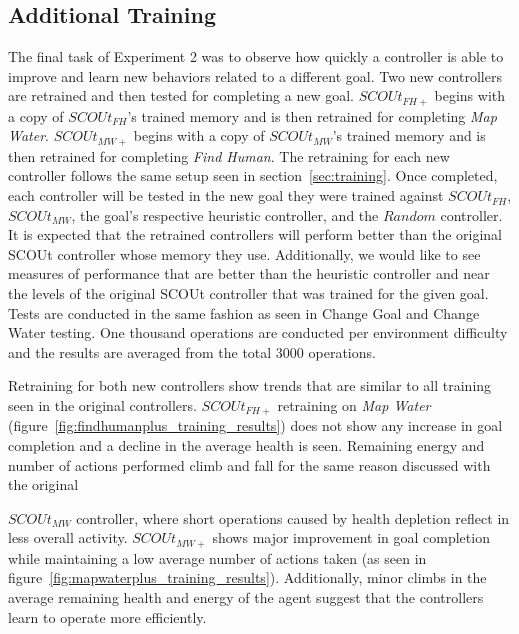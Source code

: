 \subsection{Additional Training}
The final task of Experiment 2 was to observe how quickly a controller is able to improve and learn new behaviors related to a different goal.
Two new controllers are retrained and then tested for completing a new goal.
$SCOUt_{FH+}$ begins with a copy of $SCOUt_{FH}$'s trained memory and is then retrained for completing \textit{Map Water}.
$SCOUt_{MW+}$ begins with a copy of $SCOUt_{MW}$'s trained memory and is then retrained for completing \textit{Find Human}.
The retraining for each new controller follows the same setup seen in section~\ref{sec:training}.
Once completed, each controller will be tested in the new goal they were trained against $SCOUt_{FH}$, $SCOUt_{MW}$, the goal's respective heuristic controller, and the $Random$ controller.
It is expected that the retrained controllers will perform better than the original SCOUt controller whose memory they use.
Additionally, we would like to see measures of performance that are better than the heuristic controller and near the levels of the original SCOUt controller that was trained for the given goal.
Tests are conducted in the same fashion as seen in Change Goal and Change Water testing.
One thousand operations are conducted per environment difficulty and the results are averaged from the total 3000 operations.

Retraining for both new controllers show trends that are similar to all training seen in the original controllers.
$SCOUt_{FH+}$ retraining on \textit{Map Water} (figure~\ref{fig:findhumanplus_training_results}) does not show any increase in goal completion and a decline in the average health is seen.
Remaining energy and number of actions performed climb and fall for the same reason discussed with the original

\noindent
$SCOUt_{MW}$ controller, where short operations caused by health depletion reflect in less overall activity.
$SCOUt_{MW+}$ shows major improvement in goal completion while maintaining a low average number of actions taken (as seen in figure~\ref{fig:mapwaterplus_training_results}).
Additionally, minor climbs in the average remaining health and energy of the agent suggest that the controllers learn to operate more efficiently.


